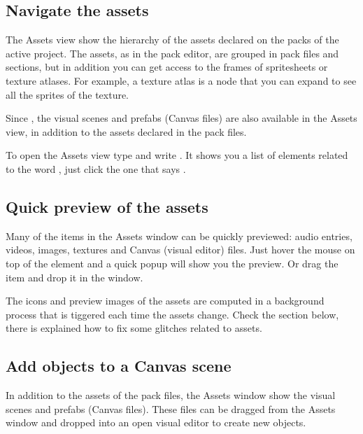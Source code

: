 \documentclass[letterpaper,10pt,english]{sphinxmanual}
\begin{document}
\subsection{Navigate the assets}
\label{\detokenize{assets_manager:navigate-the-assets}}
The Assets view show the hierarchy of the assets declared on the packs of the active project. The assets, as in the pack editor, are grouped in pack files and sections, but in addition you can get access to the frames of spritesheets or texture atlases. For example, a texture atlas is a node that you can expand to see all the sprites of the texture.

Since , the visual scenes and prefabs (Canvas files) are also available in the Assets view, in addition to the assets declared in the pack files.

\noindent{}

To open the Assets view type  and write . It shows you a list of elements related to the word , just click the one that says .


\subsection{Quick preview of the assets}
\label{\detokenize{assets_manager:quick-preview-of-the-assets}}
Many of the items in the Assets window can be quickly previewed: audio entries, videos, images, textures and Canvas (visual editor) files. Just hover the mouse on top of the element and a quick popup will show you the preview. Or drag the item and drop it in the  window.

The icons and preview images of the assets are computed in a background process that is tiggered each time the assets change. Check the {\hyperref[\detokenize{assets_manager:troubleshooting}]{}} section below, there is explained how to fix some glitches related to assets.


\subsection{Add objects to a Canvas scene}
\label{\detokenize{assets_manager:add-objects-to-a-canvas-scene}}
In addition to the assets of the pack files, the Assets window show the visual scenes and prefabs (Canvas files). These files can be dragged from the Assets window and dropped into an open visual editor to create new objects.
\end{document}
